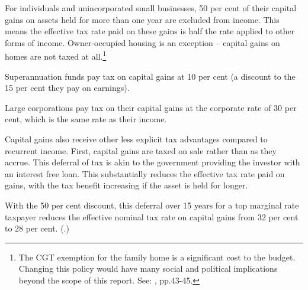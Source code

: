 For individuals and unincorporated small businesses, 50 per cent of their capital gains on assets held for more than one year are excluded from income. This means the effective tax rate paid on these gains is half the rate applied to other forms of income. Owner-occupied housing is an exception – capital gains on homes are not taxed at all.\footnote{The CGT exemption for the family home is a significant cost to the budget. Changing this policy would have many social and political implications beyond the scope of this report. See: \textcite{DaleyMcGannonSavageEtAl2013BalancingBudgets}, pp.43-45.}

Superannuation funds pay tax on capital gains at 10 per cent (a discount to the 15 per cent they pay on earnings). 

Large corporations pay tax on their capital gains at the corporate rate of 30 per cent, which is the same rate as their income.

Capital gains also receive other less explicit tax advantages compared to recurrent income. First, capital gains are taxed on sale rather than as they accrue. This deferral of tax is akin to the government providing the investor with an interest free loan.  This substantially reduces the effective tax rate paid on gains, with the tax benefit increasing if the asset is held for longer.


With the 50 per cent discount, this deferral over 15 years for a top marginal rate taxpayer reduces the effective nominal tax rate on capital gains from 32 per cent to 28 per cent. (.)

